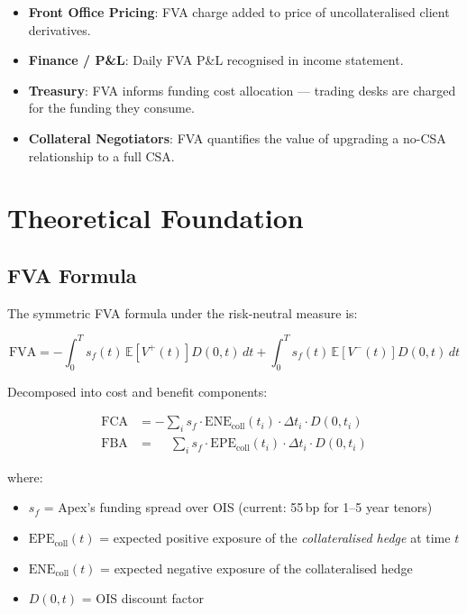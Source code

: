 \documentclass[11pt,a4paper]{article}
\begin{document}
\begin{itemize}[leftmargin=*]
  \item \textbf{Front Office Pricing}: FVA charge added to price of uncollateralised client derivatives.
  \item \textbf{Finance / P\&L}: Daily FVA P\&L recognised in income statement.
  \item \textbf{Treasury}: FVA informs funding cost allocation --- trading desks are charged for the funding they consume.
  \item \textbf{Collateral Negotiators}: FVA quantifies the value of upgrading a no-CSA relationship to a full CSA.
\end{itemize}

\section{Theoretical Foundation}

\subsection{FVA Formula}

The symmetric FVA formula under the risk-neutral measure is:

\begin{equation}
\mathrm{FVA} = -\int_0^T s_f(t)\,\mathbb{E}\!\left[V^+(t)\right] D(0,t)\,dt
             + \int_0^T s_f(t)\,\mathbb{E}\!\left[V^-(t)\right] D(0,t)\,dt
\tag{2}
\end{equation}

Decomposed into cost and benefit components:

\begin{align}
\mathrm{FCA} &= -\sum_i s_f \cdot \mathrm{ENE}_{\mathrm{coll}}(t_i) \cdot \Delta t_i \cdot D(0,t_i)
\tag{3} \\[6pt]
\mathrm{FBA} &= \phantom{-}\sum_i s_f \cdot \mathrm{EPE}_{\mathrm{coll}}(t_i) \cdot \Delta t_i \cdot D(0,t_i)
\tag{4}
\end{align}

where:
\begin{itemize}[leftmargin=*]
  \item $s_f$ = Apex's funding spread over OIS (current: 55\,bp for 1--5 year tenors)
  \item $\mathrm{EPE}_{\mathrm{coll}}(t)$ = expected positive exposure of the \emph{collateralised hedge} at time $t$
  \item $\mathrm{ENE}_{\mathrm{coll}}(t)$ = expected negative exposure of the collateralised hedge
  \item $D(0,t)$ = OIS discount factor
\end{itemize}
\end{document}
